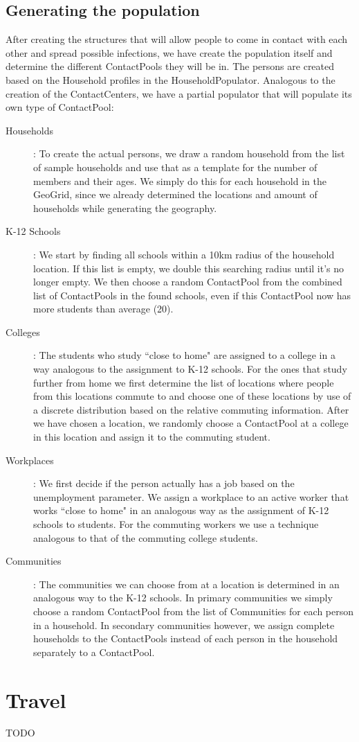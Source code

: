 \subsection{Generating the population}
\label{subsection:genpop}
After creating the structures that will allow people to come in contact with each other and spread possible infections, we have create the population itself and determine the different ContactPools they will be in.
The persons are created based on the Household profiles in the HouseholdPopulator.
Analogous to the creation of the ContactCenters, we have a partial populator that will populate its own type of ContactPool:

\begin{description}
    \item[Households]:
        To create the actual persons, we draw a random household from the list of sample households and use that as a template for the number of members and their ages.
        We simply do this for each household in the GeoGrid, since we already determined the locations and amount of households while generating the geography.
    \item[K-12 Schools]:
        We start by finding all schools within a 10km radius of the household location. If this list is empty, we double this searching radius until it's no longer empty.
        We then choose a random ContactPool from the combined list of ContactPools in the found schools, even if this ContactPool now has more students than average (20).
    \item[Colleges]:
        The students who study ``close to home" are assigned to a college in a way analogous to the assignment to K-12 schools.
        For the ones that study further from home we first determine the list of locations where people from this locations commute to and choose one of these locations by use of a discrete distribution based on the relative commuting information.
        After we have chosen a location, we randomly choose a ContactPool at a college in this location and assign it to the commuting student.
    \item[Workplaces]:
        We first decide if the person actually has a job based on the unemployment parameter.
        We assign a workplace to an active worker that works ``close to home" in an analogous way as the assignment of K-12 schools to students.
        For the commuting workers we use a technique analogous to that of the commuting college students.
    \item[Communities]:
        The communities we can choose from at a location is determined in an analogous way to the K-12 schools.
        In primary communities we simply choose a random ContactPool from the list of Communities for each person in a household.
        In secondary communities however, we assign complete households to the ContactPools instead of each person in the household separately to a ContactPool.

\end{description}


\section{Travel}
\label{section:travel}
TODO
